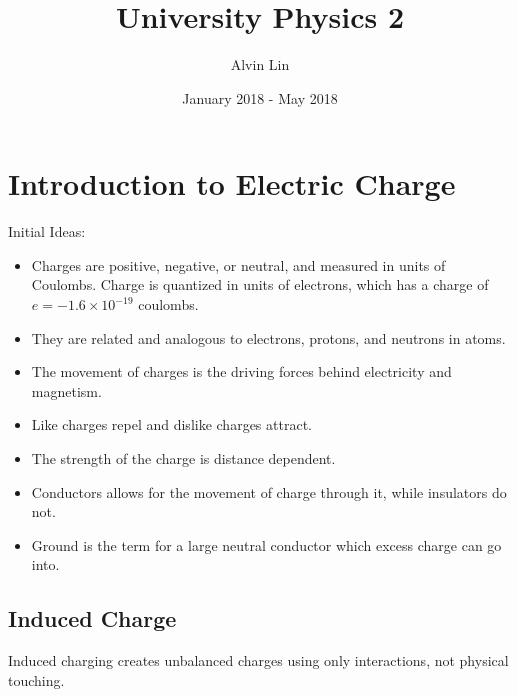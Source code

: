 \documentclass{math}
\title{University Physics 2}
\author{Alvin Lin}
\date{January 2018 - May 2018}
\begin{document}
\maketitle

\section*{Introduction to Electric Charge}
Initial Ideas:
\begin{itemize}
  \item Charges are positive, negative, or neutral, and measured in units of
  Coulombs. Charge is quantized in units of electrons, which has a charge of
  \( e = -1.6\times10^{-19} \) coulombs.
  \item They are related and analogous to electrons, protons, and neutrons in
  atoms.
  \item The movement of charges is the driving forces behind electricity and
  magnetism.
  \item Like charges repel and dislike charges attract.
  \item The strength of the charge is distance dependent.
  \item Conductors allows for the movement of charge through it, while
  insulators do not.
  \item Ground is the term for a large neutral conductor which excess charge
  can go into.
\end{itemize}

\subsection*{Induced Charge}
Induced charging creates unbalanced charges using only interactions, not
physical touching.
\begin{center}
\end{center}
\begin{center}
\end{center}
\end{document}
